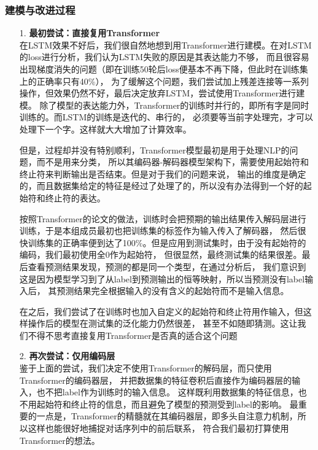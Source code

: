 \documentclass[11pt]{article}
\begin{document}
            \subsubsection{建模与改进过程}
            \begin{enumerate}
                \item [1. ]\textbf{最初尝试：直接复用Transformer}\\
                在LSTM效果不好后，我们很自然地想到用Transformer进行建模。在对LSTM的loss进行分析，我们认为LSTM失败的原因是其表达能力不够，
                而且很容易出现梯度消失的问题（即在训练50轮后loss便基本不再下降，但此时在训练集上的正确率只有40\%），
                为了缓解这个问题，我们尝试加上残差连接等一系列操作，但效果仍然不好，最后决定放弃LSTM，尝试使用Transformer进行建模。
                除了模型的表达能力外，Transformer的训练时并行的，即所有字是同时训练的。而LSTM的训练是迭代的、串行的，
                必须要等当前字处理完，才可以处理下一个字。这样就大大增加了计算效率。
                
                但是，过程却并没有特别顺利，Transformer模型最初是用于处理NLP的问题，而不是用来分类，
                所以其编码器-解码器模型架构下，需要使用起始符和终止符来判断输出是否结束。但是对于我们的问题来说，
                输出的维度是确定的，而且数据集给定的特征是经过了处理了的，所以没有办法得到一个好的起始符和终止符的表达。
                
                按照Transformer的论文的做法，训练时会把预期的输出结果传入解码层进行训练，于是本组成员最初也把训练集的标签作为输入传入了解码器，
                然后很快训练集的正确率便到达了100\%。但是应用到测试集时，由于没有起始符的编码，我们最初使用全0作为起始符，
                但很显然，最终测试集的结果很差。最后查看预测结果发现，预测的都是同一个类型，在通过分析后，
                我们意识到这是因为模型学习到了从label到预测输出的恒等映射，所以当预测没有label输入后，
                其预测结果完全根据输入的没有含义的起始符而不是输入信息。

                在之后，我们尝试了在训练时也加入自定义的起始符和终止符用作输入，但这样操作后的模型在测试集的泛化能力仍然很差，
                甚至不如随即猜测。这让我们不得不思考直接复用Transformer是否真的适合这个问题


                \item [2. ]\textbf{再次尝试：仅用编码层}\\
                鉴于上面的尝试，我们决定不使用Transformer的解码层，而只使用Transformer的编码器层，
                并把数据集的特征卷积后直接作为编码器层的输入，也不把label作为训练时的输入信息。
                这样既利用数据集的特征信息，也不用起始符和终止符的信息，而且避免了模型的预测受到label的影响。
                最重要的一点是，Transformer的精髓就在其编码器层，即多头自注意力机制，所以这样也能很好地捕捉对话序列中的前后联系，
                符合我们最初打算使用Transformer的想法。
                

\end{enumerate}
\end{document}
